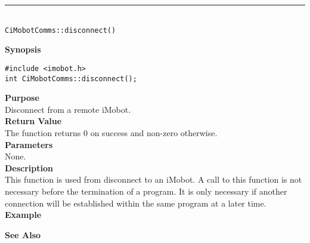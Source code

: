 \noindent
\vspace{5pt}
\rule{4.5in}{0.015in}\\
\noindent
{\LARGE \texttt{CiMobotComms::disconnect()}}\\
{}

\noindent
{\bf Synopsis}\\
\begin{verbatim}
#include <imobot.h>
int CiMobotComms::disconnect();
\end{verbatim}

\noindent
{\bf Purpose}\\
Disconnect from a remote iMobot.\\

\noindent
{\bf Return Value}\\
The function returns 0 on success and non-zero otherwise.\\

\noindent
{\bf Parameters}\\
None.\\

\noindent
{\bf Description}\\
This function is used from disconnect to an iMobot. A call to this function is
not necessary before the termination of a program. It is only necessary if
another connection will be established within the same program at a later time.
\\

\noindent
{\bf Example}\\
\noindent

\noindent
{\bf See Also}\\

